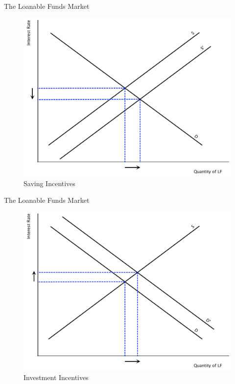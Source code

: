 \documentclass[xcolor={dvipsnames},pdf, hyperref={colorlinks=true, citecolor=ForestGreen, linkcolor=BlueViolet, urlcolor=Magenta}]{beamer}
\theoremstyle{definition}
\begin{document}
\begin{frame}[b]{The Loanable Funds Market}
	\begin{figure}[H]
	\centering
	\includegraphics[scale=.40]{plot90.pdf}
	\caption{Saving Incentives}
\end{figure}
\end{frame}

\begin{frame}[b]{The Loanable Funds Market}
	\begin{figure}[H]
		\centering
		\includegraphics[scale=.40]{plot91.pdf}
		\caption{Investment Incentives}
	\end{figure}
\end{frame}
\end{document}
